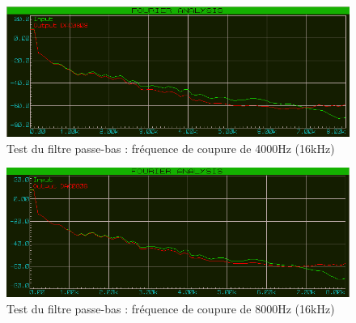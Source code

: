 \documentclass{article}
\begin{document}
    \begin{figure}[H]
        \centering
        \includegraphics[width=.75\textwidth]{./images/spectrum_low_pass_4000_16k.png}
        \caption{Test du filtre passe-bas : fréquence de coupure de 4000Hz (16kHz)}
    \end{figure}
    \begin{figure}[H]
        \centering
        \includegraphics[width=.75\textwidth]{./images/spectrum_low_pass_8000_16k.png}
        \caption{Test du filtre passe-bas : fréquence de coupure de 8000Hz (16kHz)}
    \end{figure}
\end{document}
